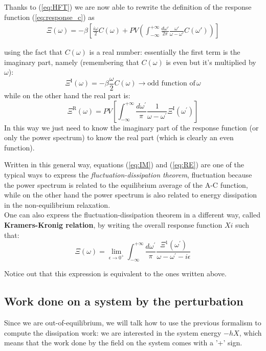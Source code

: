 \documentclass[\main/main.tex]{subfiles}
\begin{document}
Thanks to (\ref{eq:HFT}) we are now able to rewrite the definition of the response function (\ref{eq:response_c}) as
\begin{align}
    \Xi(\omega)=-\beta[\frac{i\omega}{2}C(\omega)+PV(\int_{-\infty}^{+\infty}\frac{d\omega'}{2\pi}\frac{\omega'}{\omega-\omega'}C(\omega'))]
\end{align}

using the fact that $C(\omega)$ is a real number: essentially the first term is the imaginary part, namely (remembering that $C(\omega)$ is even but it's multiplied by $\omega$):
\begin{equation}
    \boxed{\Xi^{\mathrm{I}}(\omega)=-\beta \frac{\omega}{2} C(\omega)} \longrightarrow \text{odd function of}\, \omega
    \label{eq:IM}
\end{equation}
while on the other hand the real part is:
\begin{equation}
    \boxed{\Xi^{\mathrm{R}}(\omega)=PV[ \int_{-\infty}^{+\infty} \frac{d \omega^{\prime}}{\pi} \frac{1}{\omega-\omega^{\prime}} \Xi^{\mathrm{I}}\left(\omega^{\prime}\right)]}
    \label{eq:RE}
\end{equation}
In this way we just need to know the imaginary part of the response function (or only the power spectrum) to know the real part (which is clearly an even function).

Written in this general way, equations (\ref{eq:IM}) and (\ref{eq:RE}) are one of the typical ways to express the \textit{fluctuation-dissipation theorem}, fluctuation because the power spectrum is related to the equilibrium average of the A-C function, while on the other hand the power spectrum is also related to energy dissipation in the non-equilibrium relaxation. \\

One can also express the fluctuation-dissipation theorem in a different way, called \textbf{Kramers-Kronig relation}, by writing the overall response function $Xi$ such that:
\begin{equation}
\boxed{\Xi(\omega)=\lim _{\epsilon \rightarrow 0^{+}} \int_{-\infty}^{+\infty} \frac{d \omega^{\prime}}{\pi} \frac{\Xi^{1}\left(\omega^{\prime}\right)}{\omega-\omega^{\prime}-i \epsilon}}
\end{equation}

Notice out that this expression is equivalent to the ones written above.

\subsection{Work done on a system by the perturbation}
Since we are out-of-equilibrium, we will talk how to use the previous formalism to compute the dissipation work: we are interested in the system energy $-h X$, which means that the work done by the field on the system comes with a '+' sign.
\end{document}

